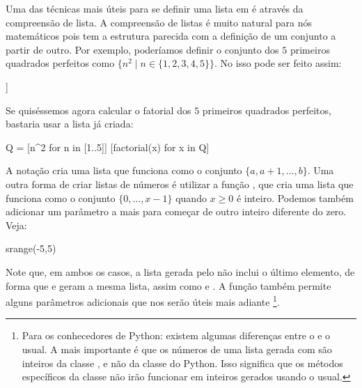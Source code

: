 Uma das técnicas mais úteis para se definir uma lista em \Sage é através
da compreensão de lista. A compreensão de listas é muito natural
para nós matemáticos pois tem a estrutura parecida com a
definição de um conjunto a partir de outro. Por exemplo, poderíamos
definir o conjunto dos $5$ primeiros quadrados perfeitos como
$\{n^2 \mid n \in\{ 1, 2, 3, 4, 5\}\}$. No \Sage isso pode ser feito assim:

\begin{sageinput}
[n^2 for n in [1..5]]
\end{sageinput}
\begin{sageoutput}
[1, 4, 9, 16, 25]
\end{sageoutput}

Se quiséssemos agora calcular o fatorial dos 
$5$ primeiros quadrados perfeitos, bastaria usar a lista já criada:
\begin{sageinput}
Q = [n^2 for n in [1..5]]
[factorial(x) for x in Q]
\end{sageinput}
\begin{sageoutput}
[1, 24, 362880, 20922789888000, 15511210043330985984000000]
\end{sageoutput}

A notação \ils{[a..b]} cria uma lista que funciona
como o conjunto $\{a,a+1,\dots,b\}$. Uma outra forma
de criar listas de números é utilizar a função
 , que cria uma lista que funciona como o
conjunto $\{0,\dots,x-1\}$ quando $x\geq 0$ é inteiro.
Podemos também adicionar um parâmetro a mais para começar de 
outro inteiro diferente do zero. Veja:
\begin{sageinput}
srange(-5,5)
\end{sageinput}
\begin{sageoutput}
[-5, -4, -3, -2, -1, 0, 1, 2, 3, 4]
\end{sageoutput}
Note que, em ambos os casos, a lista gerada pelo
 não inclui o último elemento, de forma
que \ils{[a..b]} e  geram
a mesma lista, assim como \ils{[0..x]} e
. A função  também
permite alguns parâmetros adicionais que nos
serão úteis mais adiante
\footnote{Para os conhecedores de Python:
existem algumas diferenças entre o 
e o  usual. A mais importante é que
os números de uma lista gerada com 
são inteiros da classe , e não
da classe  do Python. Isso significa
que os métodos específicos da classe 
não irão funcionar em inteiros gerados usando 
o  usual.}.

